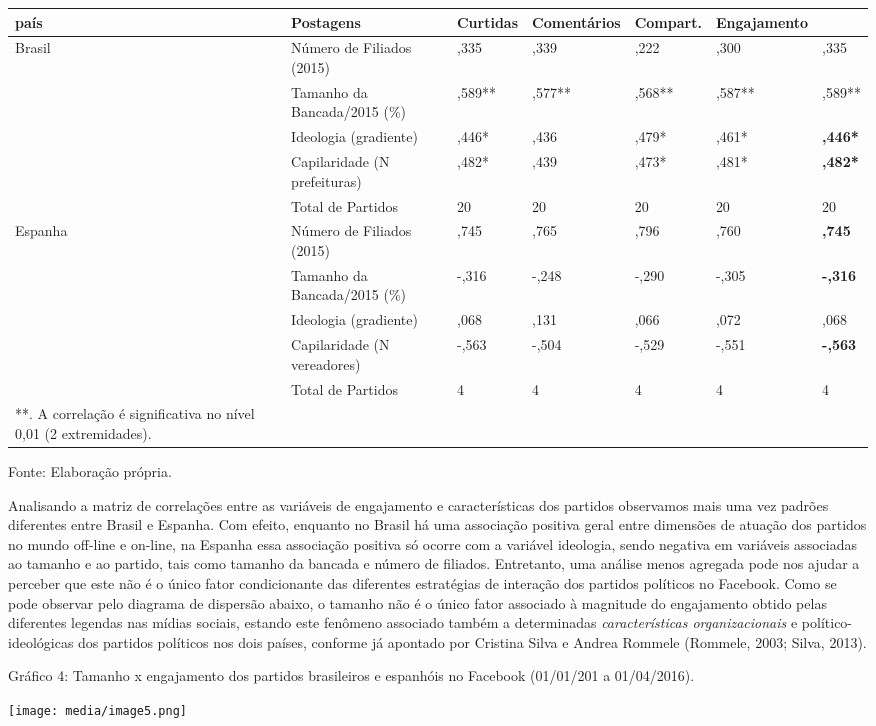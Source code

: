 \begin{longtable}[]{@{}lllllll@{}}
\toprule
país & \textbf{Postagens} & \textbf{Curtidas} & \textbf{Comentários} &
\textbf{Compart.} & \textbf{Engajamento}\tabularnewline
\midrule
\endhead
Brasil & Número de Filiados (2015) & ,335 & ,339 & ,222 & ,300 &
,335\tabularnewline
& Tamanho da Bancada/2015 (\%) & ,589** & ,577** & ,568** & ,587** &
,589**\tabularnewline
& Ideologia (gradiente) & ,446* & ,436 & ,479* & ,461* &
\textbf{,446*}\tabularnewline
& Capilaridade (N prefeituras) & ,482* & ,439 & ,473* & ,481* &
\textbf{,482*}\tabularnewline
& Total de Partidos & 20 & 20 & 20 & 20 & 20\tabularnewline
Espanha & Número de Filiados (2015) & ,745 & ,765 & ,796 & ,760 &
\textbf{,745}\tabularnewline
& Tamanho da Bancada/2015 (\%) & -,316 & -,248 & -,290 & -,305 &
\textbf{-,316}\tabularnewline
& Ideologia (gradiente) & ,068 & ,131 & ,066 & ,072 &
,068\tabularnewline
& Capilaridade (N vereadores) & -,563 & -,504 & -,529 & -,551 &
\textbf{-,563}\tabularnewline
& Total de Partidos & 4 & 4 & 4 & 4 & 4\tabularnewline
**. A correlação é significativa no nível 0,01 (2
extremidades).\tabularnewline
\bottomrule
\end{longtable}

Fonte: Elaboração própria.

Analisando a matriz de correlações entre as variáveis de engajamento e
características dos partidos observamos mais uma vez padrões diferentes
entre Brasil e Espanha. Com efeito, enquanto no Brasil há uma associação
positiva geral entre dimensões de atuação dos partidos no mundo off-line
e on-line, na Espanha essa associação positiva só ocorre com a variável
ideologia, sendo negativa em variáveis associadas ao tamanho e ao
partido, tais como tamanho da bancada e número de filiados. Entretanto,
uma análise menos agregada pode nos ajudar a perceber que este não é o
único fator condicionante das diferentes estratégias de interação dos
partidos políticos no Facebook. Como se pode observar pelo diagrama de
dispersão abaixo, o tamanho não é o único fator associado à magnitude do
engajamento obtido pelas diferentes legendas nas mídias sociais, estando
este fenômeno associado também a determinadas \emph{características
organizacionais} e político-ideológicas dos partidos políticos nos dois
países, conforme já apontado por Cristina Silva e Andrea Rommele
(Rommele, 2003; Silva, 2013).

Gráfico 4: Tamanho x engajamento dos partidos brasileiros e espanhóis no
Facebook (01/01/201 a 01/04/2016).

\texttt{[image: media/image5.png]}

